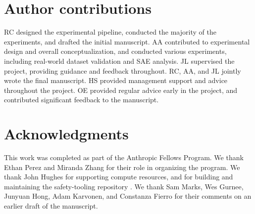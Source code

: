 \section*{Author contributions}
RC designed the experimental pipeline, conducted the majority of the experiments, and drafted the initial manuscript.
AA contributed to experimental design and overall conceptualization, and conducted various experiments, including real-world dataset validation and SAE analysis.
JL supervised the project, providing guidance and feedback throughout.
RC, AA, and JL jointly wrote the final manuscript.
HS provided management support and advice throughout the project.
OE provided regular advice early in the project, and contributed significant feedback to the manuscript.

\section*{Acknowledgments}
This work was completed as part of the Anthropic Fellows Program. We thank Ethan Perez and Miranda Zhang for their role in organizing the program. We thank John Hughes for supporting compute resources, and for building and maintaining the safety-tooling repository \citep{safety_tooling_2025}. We thank Sam Marks, Wes Gurnee, Junyuan Hong, Adam Karvonen, and Constanza Fierro for their comments on an earlier draft of the manuscript.

